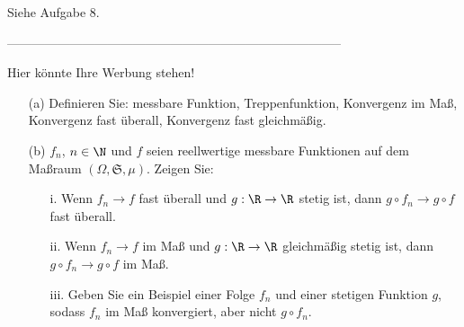 \begin{solution}

Siehe Aufgabe 8.

\end{solution}

--------------------------------------------------------------------------------

\begin{exercise}

Hier könnte Ihre Werbung stehen!

\begin{itemize}
  \item[(a)] Definieren Sie: messbare Funktion, Treppenfunktion, Konvergenz im Maß, Konvergenz fast überall, Konvergenz fast gleichmäßig.
  \item[(b)] $f_n$, $n \in \N$ und $f$ seien reellwertige messbare Funktionen auf dem Maßraum $(\Omega, \mathfrak{S}, \mu)$. Zeigen Sie:
  \begin{itemize}
    \item[i.] Wenn $f_n \to f$ fast überall und $g: \R \to \R$ stetig ist, dann $g \circ f_n \to g \circ f$ fast überall.
    \item[ii.] Wenn $f_n \to f$ im Maß und $g: \R \to \R$ gleichmäßig stetig ist, dann $g \circ f_n \to g \circ f$ im Maß.
    \item[iii.] Geben Sie ein Beispiel einer Folge $f_n$ und einer stetigen Funktion $g$, sodass $f_n$ im Maß konvergiert, aber nicht $g \circ f_n$.
  \end{itemize}
\end{itemize}

\end{exercise}

